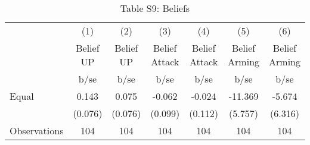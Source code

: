 \begin{table}[htbp]\centering
\def\sym#1{\ifmmode^{#1}\else\(^{#1}\)\fi}
\caption{Table S9: Beliefs}
\begin{tabular}{l*{6}{c}}
\hline\hline
                    &\multicolumn{1}{c}{(1)}&\multicolumn{1}{c}{(2)}&\multicolumn{1}{c}{(3)}&\multicolumn{1}{c}{(4)}&\multicolumn{1}{c}{(5)}&\multicolumn{1}{c}{(6)}\\
                    &\multicolumn{1}{c}{Belief UP}&\multicolumn{1}{c}{Belief UP}&\multicolumn{1}{c}{Belief Attack}&\multicolumn{1}{c}{Belief Attack}&\multicolumn{1}{c}{Belief Arming}&\multicolumn{1}{c}{Belief Arming}\\
                    &        b/se         &        b/se         &        b/se         &        b/se         &        b/se         &        b/se         \\
\hline
Equal               &       0.143         &       0.075         &      -0.062         &      -0.024         &     -11.369         &      -5.674         \\
                    &     (0.076)         &     (0.076)         &     (0.099)         &     (0.112)         &     (5.757)         &     (6.316)         \\
\hline
Observations        &         104         &         104         &         104         &         104         &         104         &         104         \\
\hline\hline
\end{tabular}
\end{table}
